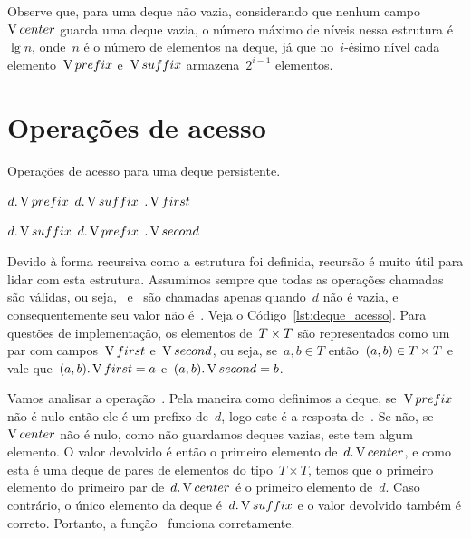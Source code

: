 \documentclass[main.tex]{subfiles}
\begin{document}
Observe que, para uma deque não vazia, considerando que nenhum campo~$\operatorname{V}{center}$ guarda uma deque vazia, o número máximo de níveis nessa estrutura é~$\lg n$, onde~$n$ é o número de elementos na deque, já que no~$i$-ésimo nível cada elemento~$\operatorname{V}{prefix}$ e~$\operatorname{V}{suffix}$ armazena~$2^{i-1}$ elementos.


\section{Operações de acesso}


\begin{algorithm}
\caption{Operações de acesso para uma deque persistente.} \label{lst:deque_acesso}
\begin{algorithmic}[1]

	\State \Return \Null
\EndFunction

		\State \Return $d.\operatorname{V}{prefix}$
		\State \Return $d.\operatorname{V}{suffix}$
	\Else
		\State \Return {}$.\operatorname{V}{first}$
	\EndIf
\EndFunction

		\State \Return $d.\operatorname{V}{suffix}$
		\State \Return $d.\operatorname{V}{prefix}$
	\Else
		\State \Return {}$.\operatorname{V}{second}$
	\EndIf
\EndFunction



\end{algorithmic}
\end{algorithm}

Devido à forma recursiva como a estrutura foi definida, recursão é muito útil para lidar com esta estrutura.
Assumimos sempre que todas as operações chamadas são válidas, ou seja,~ e~ são chamadas apenas quando~$d$ não é vazia, e consequentemente seu valor não é~. Veja o Código~\ref{lst:deque_acesso}. Para questões de implementação, os elementos de~$T \times T$ são representados como um par com campos~$\operatorname{V}{first}$ e~$\operatorname{V}{second}$, ou seja, se~$a, b \in T$ então~$(a, b) \in T \times T$ e vale que~$(a, b).\operatorname{V}{first} = a$ e~$(a, b).\operatorname{V}{second} = b$.

Vamos analisar a operação~. Pela maneira como definimos a deque, se~$\operatorname{V}{prefix}$ não é nulo então ele é um prefixo de~$d$, logo este é a resposta de~. Se não, se~$\operatorname{V}{center}$ não é nulo, como não guardamos deques vazias, este tem algum elemento. O valor devolvido é então o primeiro elemento de~$d.\operatorname{V}{center}$, e como esta é uma deque de pares de elementos do tipo~$T \times T$, temos que o primeiro elemento do primeiro par de~$d.\operatorname{V}{center}$ é o primeiro elemento de~$d$. Caso contrário, o único elemento da deque é~$d.\operatorname{V}{suffix}$ e o valor devolvido também é correto.
Portanto, a função~ funciona corretamente.
\end{document}
